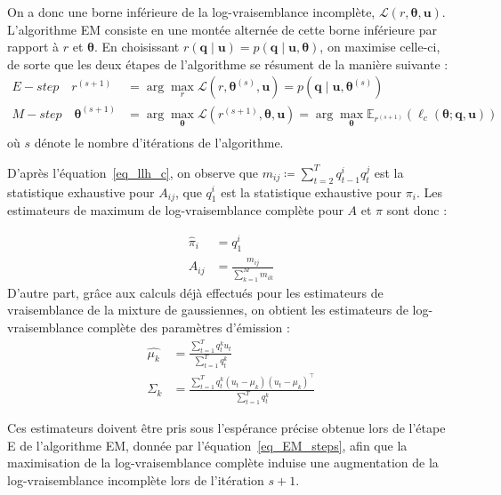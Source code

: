 \documentclass[12pt,a4paper,onecolumn]{article}
\begin{document}
On a donc une borne inférieure de la log-vraisemblance incomplète, \(\mathcal{L}(r, \bm{\theta}, \bm{u})\). L'algorithme EM consiste en une montée alternée de cette borne inférieure par rapport à \(r\) et \(\bm{\theta}\). En choisissant \(r(\bm{q} \mid \bm{u}) = p(\bm{q} \mid \bm{u}, \bm{\theta})\), on maximise celle-ci, de sorte que les deux étapes de l'algorithme se résument de la manière suivante :
\begin{equation}
	\begin{split}
		E-step \quad r^{(s+1)} &= \operatorname{arg}\max_{r} \mathcal{L}(r, \bm{\theta}^{(s)}, \bm{u}) = p(\bm{q} \mid \bm{u}, \bm{\theta}^{(s)})\\
		M-step \quad \bm{\theta}^{(s+1)} &= \operatorname{arg}\max_{\bm{\theta}} \mathcal{L}(r^{(s+1)}, \bm{\theta}, \bm{u}) = \operatorname{arg}\max_{\bm{\theta}} \mathbb{E}_{r^{(s+1)}}(\ell_c(\bm{\theta} ; \bm{q}, \bm{u}))\\
	\end{split}
	\label{eq_EM_steps}
\end{equation}
où \(s\) dénote le nombre d'itérations de l'algorithme.

D'après l'équation~\eqref{eq_llh_c}, on observe que \(m_{ij} \coloneqq \sum_{t=2}^T q_{t-1}^i q_t^j\) est la statistique exhaustive pour \(A_{ij}\), que \(q_1^i\) est la statistique exhaustive pour \(\pi_i\). Les estimateurs de maximum de log-vraisemblance complète pour \(A\) et \(\pi\) sont donc :

\begin{align}
	\widehat{\pi}_{i} & = q_1^i                              \label{eq_pi_MLE}  \\
	\widehat{A}_{ij}  & = \frac{m_{ij}}{\sum_{k = 1}^M m_{ik}} \label{eq_A_MLE}
\end{align}
D'autre part, grâce aux calculs déjà effectués pour les estimateurs de vraisemblance de la mixture de gaussiennes, on obtient les estimateurs de log-vraisemblance complète des paramètres d'émission :
\begin{align}
	\widehat{\mu_k}    & = \frac{\sum_{t = 1}^T q_{t}^k u_t}{\sum_{t = 1}^T q_{t}^k}                                                     \\
	\widehat{\Sigma_k} & = \frac{\sum_{t = 1}^T q_t^k\left(u_t - \mu_k\right)\left(u_t - \mu_k\right)^{\intercal}}{\sum_{t = 1}^T q_t^k}
\end{align}

Ces estimateurs doivent être pris sous l'espérance précise obtenue lors de l'étape E de l'algorithme EM, donnée par l'équation~\eqref{eq_EM_steps}, afin que la maximisation de la log-vraisemblance complète induise une augmentation de la log-vraisemblance incomplète lors de l'itération \(s + 1\).
\end{document}
